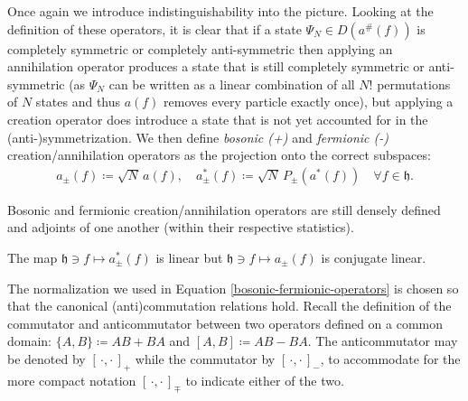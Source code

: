 Once again we introduce indistinguishability into the picture. Looking at the definition of
these operators, it is clear that if a state $\Psi_N\in D(a^\#(f))$ is completely symmetric
or completely anti-symmetric then applying an annihilation operator produces a state that is
still completely symmetric or anti-symmetric (as $\Psi_N$ can be written as a linear
combination of all $N!$ permutations of $N$ states and thus $a(f)$ removes every particle
exactly once), but applying a creation operator does introduce a state that is not yet
accounted for in the (anti-)symmetrization. We then define \textit{bosonic (+)} and
\textit{fermionic (-)} creation/annihilation operators as the projection onto the correct
subspaces:
\begin{align}
	\label{bosonic-fermionic-operators}
	a_\pm(f) \coloneq \sqrt{N}\,a(f), \quad a^*_\pm(f) \coloneq \sqrt{N}\,P_\pm (a^*(f)) \quad \forall f\in\mathfrak{h}.
\end{align}

\begin{remark}
	Bosonic and fermionic creation/annihilation operators are still densely defined and
	adjoints of one another (within their respective statistics).
\end{remark}

\begin{remark}
	The map $\mathfrak{h}\ni f\mapsto a^*_\pm(f)$ is linear but $\mathfrak{h}\ni f\mapsto
	a_\pm(f)$ is conjugate linear.
\end{remark}

The normalization we used in Equation \eqref{bosonic-fermionic-operators} is chosen so that
the canonical (anti)commutation relations hold. Recall the definition of the commutator and
anticommutator between two operators defined on a common domain: $\{A,B\}\coloneq AB + BA$ and
$[A,B]\coloneq AB - BA$. The anticommutator may be denoted by $[\,\cdot,\cdot\,]_+$ while the
commutator by $[\,\cdot,\cdot\,]_-$, to accommodate for the more compact notation
$[\,\cdot,\cdot\,]_\mp$ to indicate either of the two.

